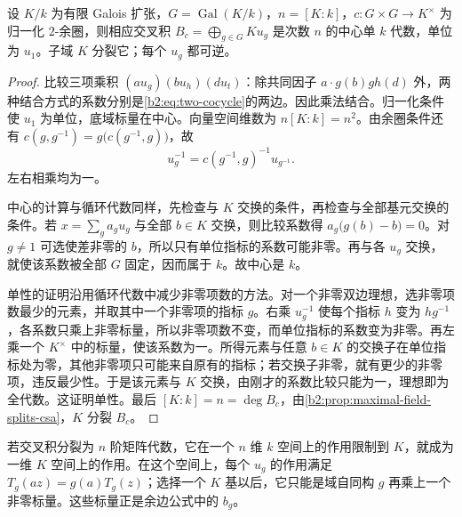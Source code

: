 \begin{proposition}\label{b2:prop:crossed-product-central-simple}
	设 \(K/k\) 为有限 Galois 扩张，\(G=\operatorname{Gal}(K/k)\)，\(n=[K:k]\)，\(c:G\times G\rightarrow K^\times\) 为归一化 \(2\)-余圈，则相应交叉积 \(B_c=\bigoplus_{g\in G}Ku_g\) 是次数 \(n\) 的中心单 \(k\) 代数，单位为 \(u_1\)。子域 \(K\) 分裂它；每个 \(u_g\) 都可逆。
\end{proposition}
\begin{proof}
	比较三项乘积 \((a u_g)(b u_h)(d u_t)\)：除共同因子 \(a\cdot g(b)gh(d)\) 外，两种结合方式的系数分别是\eqref{b2:eq:two-cocycle}的两边。因此乘法结合。归一化条件使 \(u_1\) 为单位，底域标量在中心。向量空间维数为 \(n[K:k]=n^2\)。由余圈条件还有 \(c(g,g^{-1})=g\bigl(c(g^{-1},g)\bigr)\)，故
	\[
		u_g^{-1}=c(g^{-1},g)^{-1}u_{g^{-1}}.
	\]
	左右相乘均为一。

	中心的计算与循环代数同样，先检查与 \(K\) 交换的条件，再检查与全部基元交换的条件。若 \(x=\sum_g a_g u_g\) 与全部 \(b\in K\) 交换，则比较系数得 \(a_g\bigl(g(b)-b\bigr)=0\)。对 \(g\ne1\) 可选使差非零的 \(b\)，所以只有单位指标的系数可能非零。再与各 \(u_g\) 交换，就使该系数被全部 \(G\) 固定，因而属于 \(k\)。故中心是 \(k\)。

	单性的证明沿用循环代数中减少非零项数的方法。对一个非零双边理想，选非零项数最少的元素，并取其中一个非零项的指标 \(g\)。右乘 \(u_g^{-1}\) 使每个指标 \(h\) 变为 \(hg^{-1}\)，各系数只乘上非零标量，所以非零项数不变，而单位指标的系数变为非零。再左乘一个 \(K^\times\) 中的标量，使该系数为一。所得元素与任意 \(b\in K\) 的交换子在单位指标处为零，其他非零项只可能来自原有的指标；若交换子非零，就有更少的非零项，违反最少性。于是该元素与 \(K\) 交换，由刚才的系数比较只能为一，理想即为全代数。这证明单性。最后 \([K:k]=n=\deg B_c\)，由\cref{b2:prop:maximal-field-splits-csa}，\(K\) 分裂 \(B_c\)。
\end{proof}

若交叉积分裂为 \(n\) 阶矩阵代数，它在一个 \(n\) 维 \(k\) 空间上的作用限制到 \(K\)，就成为一维 \(K\) 空间上的作用。在这个空间上，每个 \(u_g\) 的作用满足 \(T_g(az)=g(a)T_g(z)\)；选择一个 \(K\) 基以后，它只能是域自同构 \(g\) 再乘上一个非零标量。这些标量正是余边公式中的 \(b_g\)。

